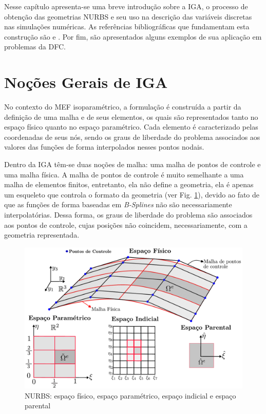 \documentclass[tese_patricia]{subfiles}
\begin{document}
Nesse capítulo apresenta-se uma breve introdução sobre a IGA, o processo de obtenção das geometrias NURBS e seu uso na descrição das variáveis discretas nas simulações numéricas. As referências bibliográficas que fundamentam esta construção são  e . Por fim, são apresentados alguns exemplos de sua aplicação em problemas da DFC.


\section{Noções Gerais de IGA}

No contexto do MEF isoparamétrico, a formulação é construída a partir da definição de uma malha e de seus elementos, os quais são representados tanto no espaço físico quanto no espaço paramétrico. Cada elemento é caracterizado pelas coordenadas de seus nós, sendo os graus de liberdade do problema associados aos valores das funções de forma interpolados nesses pontos nodais.

Dentro da IGA têm-se duas noções de malha: uma malha de pontos de controle e uma malha física. A malha de pontos de controle é muito semelhante a uma malha de elementos finitos, entretanto, ela não define a geometria, ela é apenas um esqueleto que controla o formato da geometria (ver Fig. \ref{fig:espacos_NURBS}), devido ao fato de que as funções de forma baseadas em \textit{B-Splines} não são necessariamente interpolatórias. Dessa forma, os graus de liberdade do problema são associados aos pontos de controle, cujas posições não coincidem, necessariamente, com a geometria representada.

\begin{figure}[htb!]
	\centering 
	\includegraphics[scale=0.7,trim=0cm 0cm 0cm 0cm, clip=true]{Imagens/Cap3/espacos_NURBS.pdf}	
	\caption{NURBS: espaço físico, espaço paramétrico, espaço indicial e espaço parental}
	\label{fig:espacos_NURBS}
\end{figure}
\end{document}
